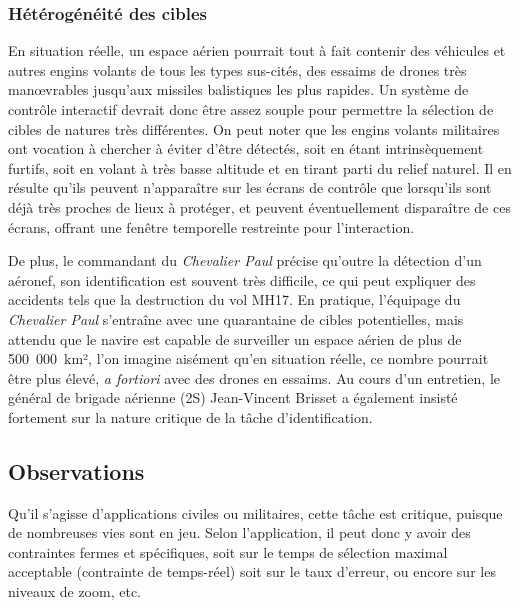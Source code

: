 	\subsubsection{Hétérogénéité des cibles}
	En situation réelle, un espace aérien pourrait tout à fait contenir des véhicules et autres engins volants de tous les types sus-cités, des essaims de drones très manœvrables jusqu'aux missiles balistiques les plus rapides. Un système de contrôle interactif devrait donc être assez souple pour permettre la sélection de cibles de natures très différentes.
	On peut noter que les engins volants militaires ont vocation à chercher à éviter d'être détectés, soit en étant intrinsèquement furtifs, soit en volant à très basse altitude et en tirant parti du relief naturel. Il en résulte qu'ils peuvent n'apparaître sur les écrans de contrôle que lorsqu'ils sont déjà très proches de lieux à protéger, et peuvent éventuellement disparaître de ces écrans, offrant une fenêtre temporelle restreinte pour l'interaction.
	
	De plus, le commandant du \emph{Chevalier Paul}\footnotemark{} précise qu'outre la détection d'un aéronef, son identification est souvent très difficile, ce qui peut expliquer des accidents tels que la destruction du vol MH17\footnotemark{}. En pratique, l'équipage du \emph{Chevalier Paul} s'entraîne avec une quarantaine de cibles potentielles, mais attendu que le navire est capable de surveiller un espace aérien de plus de 500~000~km², l'on imagine aisément qu'en situation réelle, ce nombre pourrait être plus élevé, \emph{a fortiori} avec des drones en essaims. Au cours d'un entretien, le général de brigade aérienne (2S) Jean-Vincent Brisset a également insisté fortement sur la nature critique de la tâche d'identification.	
	
	\addtocounter{footnote}{-1}
	\addtocounter{footnote}{1}
	
	\FloatBarrier \subsection{Observations}
	Qu'il s'agisse d'applications civiles ou militaires, cette tâche est critique, puisque de nombreuses vies sont en jeu. Selon l'application, il peut donc y avoir des contraintes fermes et spécifiques, soit sur le temps de sélection maximal acceptable (contrainte de temps-réel) soit sur le taux d'erreur, ou encore sur les niveaux de zoom, etc.

